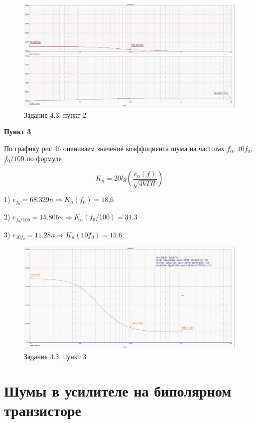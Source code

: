 \documentclass[a4paper, 14pt]{extarticle}%
\begin{document}
\begin{figure}[h!]
			\centering
			\includegraphics[width=1.1\linewidth]{4/4_3_5.jpg}
			\caption{Задание 4.3, пункт 2}
			\label{A}
\end{figure}


\textbf{Пункт 3}


По графику рис.46 оцениваем значение коэффициента шума на частотах $f_0$, $10f_0$, $f_0/100$ по формуле


\[  K_n = 20lg(\frac{e_n(f)}{\sqrt{4kTR}})   \]


1) $e_{f_0}= 68.329n \Rightarrow  K_n(f_0) = 18.6 $

2) $e_{f_0/100}= 15.806n \Rightarrow K_n(f_0/100) = 31.3$

3) $e_{10f_0}= 11.28n \Rightarrow  K_n(10f_0) = 15.6$


\begin{figure}[h!]
			\centering
			\includegraphics[width=1.1\linewidth]{4/4_3_1.jpg}
			\caption{Задание 4.3, пункт 3}
			\label{A}
\end{figure}


\newpage

\section{Шумы в усилителе на биполярном транзисторе}
\end{document}
